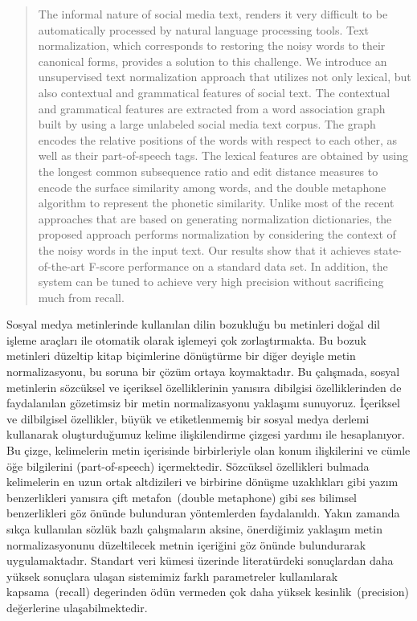 \documentclass[a4paper,onesided,12pt]{report}
\begin{document}
\begin{abstract}
The informal nature of social media text, renders it very difficult to be automatically processed by natural language processing tools. Text normalization, which corresponds to restoring the noisy words to their canonical forms, provides a solution to this challenge.
We introduce an unsupervised text normalization approach that utilizes not only lexical, but also contextual and grammatical features of social text.
The contextual and grammatical features are extracted from a word association graph built by using a large unlabeled social media text corpus.
The graph encodes the relative positions of the words with respect to each other, as well as their part-of-speech tags.
The lexical features are obtained by using the longest common subsequence ratio and edit distance measures to encode the surface similarity among words, and the double metaphone algorithm to represent the phonetic similarity. Unlike most of the recent approaches that are based on generating normalization dictionaries, the proposed approach performs normalization by considering the context of the noisy words in the input text.
Our results show that it achieves state-of-the-art F-score performance on a standard data set. In addition, the system can be tuned to achieve very high precision without sacrificing much from recall.
\end{abstract}
\begin{ozet}
Sosyal medya metinlerinde kullanılan dilin bozukluğu bu metinleri doğal dil işleme araçları ile otomatik olarak işlemeyi çok zorlaştırmakta. Bu bozuk metinleri düzeltip kitap biçimlerine dönüştürme bir diğer deyişle metin normalizasyonu, bu soruna bir çözüm ortaya koymaktadır.
Bu çalışmada, sosyal metinlerin sözcüksel ve içeriksel özelliklerinin yanısıra dibilgisi özelliklerinden de faydalanılan gözetimsiz bir metin normalizasyonu yaklaşımı sunuyoruz.
İçeriksel ve dilbilgisel özellikler, büyük ve etiketlenmemiş bir sosyal medya derlemi kullanarak oluşturduğumuz kelime ilişkilendirme çizgesi yardımı ile hesaplanıyor. Bu çizge, kelimelerin metin içerisinde birbirleriyle olan konum ilişkilerini ve cümle öğe bilgilerini (part-of-speech) içermektedir.
Sözcüksel özellikleri bulmada kelimelerin en uzun ortak altdizileri ve birbirine dönüşme uzaklıkları gibi yazım benzerlikleri yanısıra çift metafon~(double metaphone) gibi ses bilimsel benzerlikleri göz önünde bulunduran yöntemlerden faydalanıldı. Yakın zamanda sıkça kullanılan sözlük bazlı çalışmaların aksine, önerdiğimiz yaklaşım metin normalizasyonunu düzeltilecek metnin içeriğini göz önünde bulundurarak uygulamaktadır.
Standart veri kümesi üzerinde literatürdeki sonuçlardan daha yüksek sonuçlara ulaşan sistemimiz farklı parametreler kullanılarak kapsama~(recall) degerinden ödün vermeden çok daha yüksek kesinlik~(precision) değerlerine ulaşabilmektedir.
\end{ozet}
\end{document}
